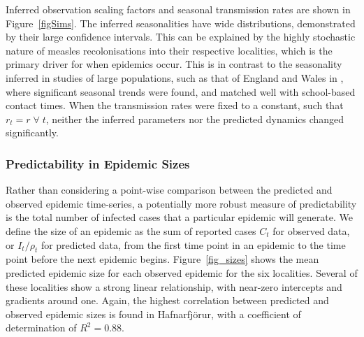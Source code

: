 \documentclass[10pt]{article}
\begin{document}
Inferred observation scaling factors and seasonal transmission rates are shown in Figure~\ref{figSims}. The inferred seasonalities have wide distributions, demonstrated by their large confidence intervals. This can be explained by the highly stochastic nature of measles recolonisations into their respective localities, which is the primary driver for when epidemics occur. This is in contrast to the seasonality inferred in studies of large populations, such as that of England and Wales in \cite{Finkenstadt2000}, where significant seasonal trends were found, and matched well with school-based contact times. When the transmission rates were fixed to a constant, such that $r_t = r \; \forall \; t$, neither the inferred parameters nor the predicted dynamics changed significantly. 






\subsubsection*{Predictability in Epidemic Sizes}

Rather than considering a point-wise comparison between the predicted and observed epidemic time-series, a potentially more robust measure of predictability is the total number of infected cases that a particular epidemic will generate. We define the size of an epidemic as the sum of reported cases $C_t$ for observed data, or $I_t / \rho_t$ for predicted data, from the first time point in an epidemic to the time point before the next epidemic begins. Figure~\ref{fig_sizes} shows the mean predicted epidemic size for each observed epidemic for the six localities. Several of these localities show a strong linear relationship, with near-zero intercepts and gradients around one. Again, the highest correlation between predicted and observed epidemic sizes is found in Hafnarfj\"{o}r\dh{}ur, with a coefficient of determination of $R^2 = 0.88$.







	 
\end{document}
